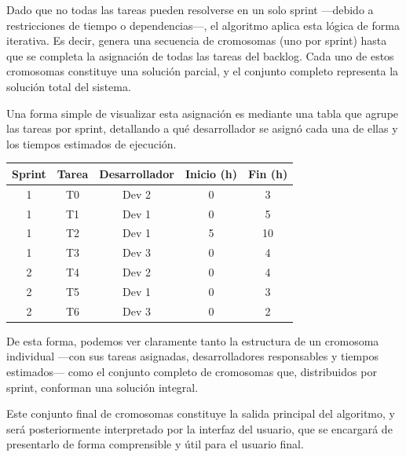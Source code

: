 Dado que no todas las tareas pueden resolverse en un solo sprint —debido a restricciones de tiempo o dependencias—, el algoritmo aplica esta lógica de forma iterativa. Es decir, genera una secuencia de cromosomas (uno por sprint) hasta que se completa la asignación de todas las tareas del backlog. Cada uno de estos cromosomas constituye una solución parcial, y el conjunto completo representa la solución total del sistema.

Una forma simple de visualizar esta asignación es mediante una tabla que agrupe las tareas por sprint, detallando a qué desarrollador se asignó cada una de ellas y los tiempos estimados de ejecución.

\begin{center}
    \begin{tabular}{|c|c|c|c|c|}
        \hline
        \textbf{Sprint} & \textbf{Tarea} & \textbf{Desarrollador} & \textbf{Inicio (h)} & \textbf{Fin (h)} \\
        \hline
        1               & T0             & Dev 2                  & 0                   & 3                \\
        1               & T1             & Dev 1                  & 0                   & 5                \\
        1               & T2             & Dev 1                  & 5                   & 10               \\
        1               & T3             & Dev 3                  & 0                   & 4                \\
        \hline
        2               & T4             & Dev 2                  & 0                   & 4                \\
        2               & T5             & Dev 1                  & 0                   & 3                \\
        2               & T6             & Dev 3                  & 0                   & 2                \\
        \hline
    \end{tabular}
\end{center}

De esta forma, podemos ver claramente tanto la estructura de un cromosoma individual —con sus tareas asignadas, desarrolladores responsables y tiempos estimados— como el conjunto completo de cromosomas que, distribuidos por sprint, conforman una solución integral.

Este conjunto final de cromosomas constituye la salida principal del algoritmo, y será posteriormente interpretado por la interfaz del usuario, que se encargará de presentarlo de forma comprensible y útil para el usuario final.

